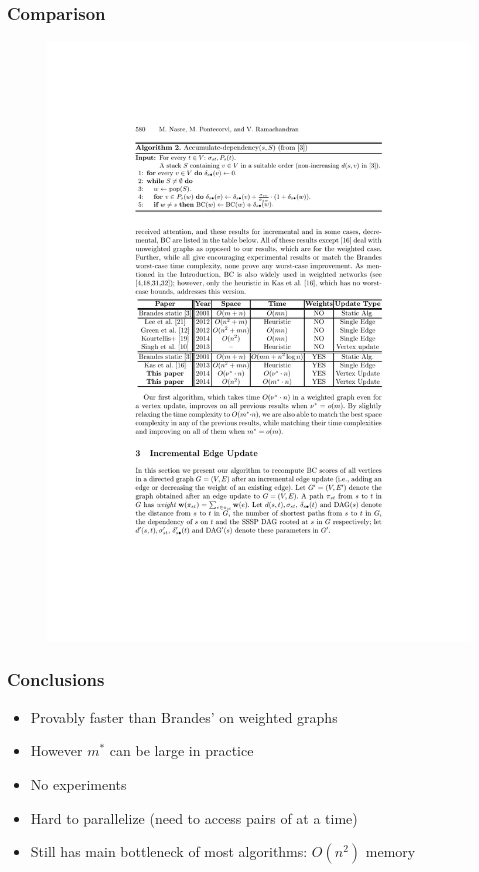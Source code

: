 \begin{frame}
  \frametitle{Comparison}

  \begin{figure}[H]
    \centering
    \includegraphics[width=\textwidth]{imgs/npr14-comparison}
  \end{figure}
\end{frame}


\begin{frame}
  \frametitle{Conclusions}

  \begin{itemize}
    \item Provably faster than Brandes' on weighted graphs
    \item However $m^*$ can be large in practice
    \item No experiments
    \item Hard to parallelize (need to access pairs of \spdag at a time)
    \item Still has main bottleneck of most algorithms: $O(n^2)$ memory
  \end{itemize}
\end{frame}


